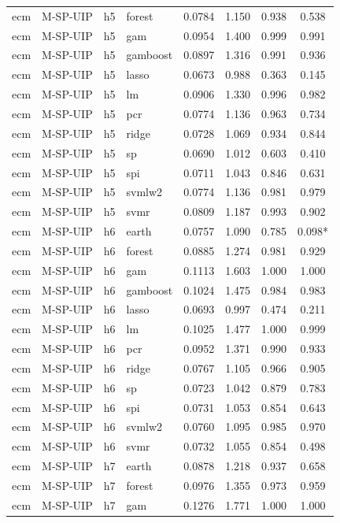 \begin{ThreePartTable}
\begin{longtable}[t]{llclcccc}
ecm & M-SP-UIP & h5 & forest & 0.0784 & 1.150 & 0.938 & 0.538\\
ecm & M-SP-UIP & h5 & gam & 0.0954 & 1.400 & 0.999 & 0.991\\
ecm & M-SP-UIP & h5 & gamboost & 0.0897 & 1.316 & 0.991 & 0.936\\
ecm & M-SP-UIP & h5 & lasso & 0.0673 & 0.988 & 0.363 & 0.145\\
ecm & M-SP-UIP & h5 & lm & 0.0906 & 1.330 & 0.996 & 0.982\\
ecm & M-SP-UIP & h5 & pcr & 0.0774 & 1.136 & 0.963 & 0.734\\
ecm & M-SP-UIP & h5 & ridge & 0.0728 & 1.069 & 0.934 & 0.844\\
ecm & M-SP-UIP & h5 & sp & 0.0690 & 1.012 & 0.603 & 0.410\\
ecm & M-SP-UIP & h5 & spi & 0.0711 & 1.043 & 0.846 & 0.631\\
ecm & M-SP-UIP & h5 & svmlw2 & 0.0774 & 1.136 & 0.981 & 0.979\\
ecm & M-SP-UIP & h5 & svmr & 0.0809 & 1.187 & 0.993 & 0.902\\
\addlinespace
ecm & M-SP-UIP & h6 & earth & 0.0757 & 1.090 & 0.785 & 0.098*\\
ecm & M-SP-UIP & h6 & forest & 0.0885 & 1.274 & 0.981 & 0.929\\
ecm & M-SP-UIP & h6 & gam & 0.1113 & 1.603 & 1.000 & 1.000\\
ecm & M-SP-UIP & h6 & gamboost & 0.1024 & 1.475 & 0.984 & 0.983\\
ecm & M-SP-UIP & h6 & lasso & 0.0693 & 0.997 & 0.474 & 0.211\\
ecm & M-SP-UIP & h6 & lm & 0.1025 & 1.477 & 1.000 & 0.999\\
ecm & M-SP-UIP & h6 & pcr & 0.0952 & 1.371 & 0.990 & 0.933\\
ecm & M-SP-UIP & h6 & ridge & 0.0767 & 1.105 & 0.966 & 0.905\\
ecm & M-SP-UIP & h6 & sp & 0.0723 & 1.042 & 0.879 & 0.783\\
ecm & M-SP-UIP & h6 & spi & 0.0731 & 1.053 & 0.854 & 0.643\\
ecm & M-SP-UIP & h6 & svmlw2 & 0.0760 & 1.095 & 0.985 & 0.970\\
ecm & M-SP-UIP & h6 & svmr & 0.0732 & 1.055 & 0.854 & 0.498\\
\addlinespace
ecm & M-SP-UIP & h7 & earth & 0.0878 & 1.218 & 0.937 & 0.658\\
ecm & M-SP-UIP & h7 & forest & 0.0976 & 1.355 & 0.973 & 0.959\\
ecm & M-SP-UIP & h7 & gam & 0.1276 & 1.771 & 1.000 & 1.000\\

\end{longtable}
\end{ThreePartTable}
